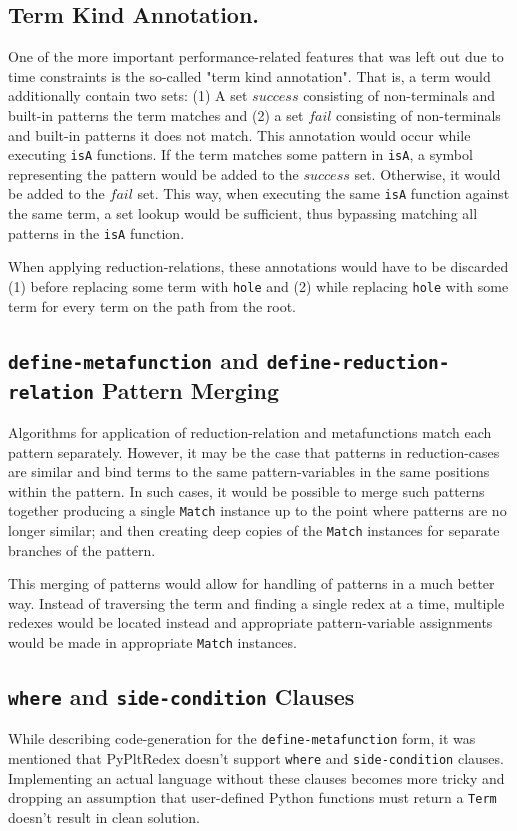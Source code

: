 \subsection{Term Kind Annotation.}
One of the more important performance-related features that was left out due to time constraints is the so-called "term kind annotation". That is, a term would additionally contain two sets: (1) A set $success$ consisting of non-terminals and built-in patterns the term matches and (2) a set $fail$ consisting of non-terminals and built-in patterns it does not match. This annotation would occur while executing \texttt{isA} functions. If the term matches some pattern in \texttt{isA}, a symbol representing the pattern would be added to the $success$ set. Otherwise, it would be added to the $fail$ set. This way, when executing the same \texttt{isA} function against the same term, a set lookup would be sufficient, thus bypassing matching all patterns in the \texttt{isA} function.

When applying reduction-relations, these annotations would have to be discarded (1) before replacing some term with \texttt{hole} and (2) while replacing \texttt{hole} with some term for every term on the path from the root.


\subsection{\texttt{define-metafunction} and \texttt{define-reduction-relation} Pattern Merging}

Algorithms for application of reduction-relation and metafunctions match each pattern separately. However, it may be the case that patterns in reduction-cases are similar and bind terms to the same pattern-variables in the same positions within the pattern. In such cases, it would be possible to merge such patterns together producing a single \texttt{Match} instance up to the point where patterns are no longer similar; and then creating deep copies of the \texttt{Match} instances for separate branches of the pattern.

This merging of patterns would allow for handling of \PatternInHoleNoArg \space patterns in a much better way. Instead of traversing the term and finding a single redex at a time, multiple redexes would be located instead and appropriate pattern-variable assignments would be made in appropriate \texttt{Match} instances.

\subsection{\texttt{where} and \texttt{side-condition} Clauses}
While describing code-generation for the \texttt{define-metafunction} form, it was mentioned that PyPltRedex doesn't support \texttt{where} and \texttt{side-condition} clauses. Implementing an actual language without these clauses becomes more tricky and dropping an assumption that user-defined Python functions must return a \texttt{Term} doesn't result in clean solution.

